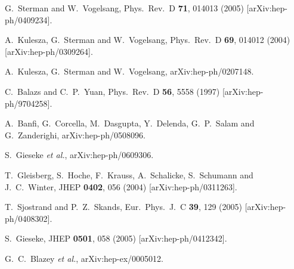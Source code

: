 \documentclass[12pt]{iopart}
\begin{document}
\begin{thebibliography}{99}
  G.~Sterman and W.~Vogelsang,
  Phys.\ Rev.\ D {\bf 71}, 014013 (2005)
  [arXiv:hep-ph/0409234].

  A.~Kulesza, G.~Sterman and W.~Vogelsang,
  Phys.\ Rev.\ D {\bf 69}, 014012 (2004)
  [arXiv:hep-ph/0309264].

  A.~Kulesza, G.~Sterman and W.~Vogelsang,
  arXiv:hep-ph/0207148.

  C.~Balazs and C.~P.~Yuan,
  Phys.\ Rev.\ D {\bf 56}, 5558 (1997)
  [arXiv:hep-ph/9704258].
  
  A.~Banfi, G.~Corcella, M.~Dasgupta, Y.~Delenda, G.~P.~Salam and G.~Zanderighi,
  arXiv:hep-ph/0508096.
 
  S.~Gieseke {\it et al.},
  arXiv:hep-ph/0609306.

  T.~Gleisberg, S.~Hoche, F.~Krauss, A.~Schalicke, S.~Schumann and J.~C.~Winter,
  JHEP {\bf 0402}, 056 (2004)
  [arXiv:hep-ph/0311263].

  T.~Sjostrand and P.~Z.~Skands,
  Eur.\ Phys.\ J.\ C {\bf 39}, 129 (2005)
  [arXiv:hep-ph/0408302].

  S.~Gieseke,
  JHEP {\bf 0501}, 058 (2005)
  [arXiv:hep-ph/0412342].

G.~C.~Blazey {\it et al.},
arXiv:hep-ex/0005012.


\end{thebibliography}
\end{document}
